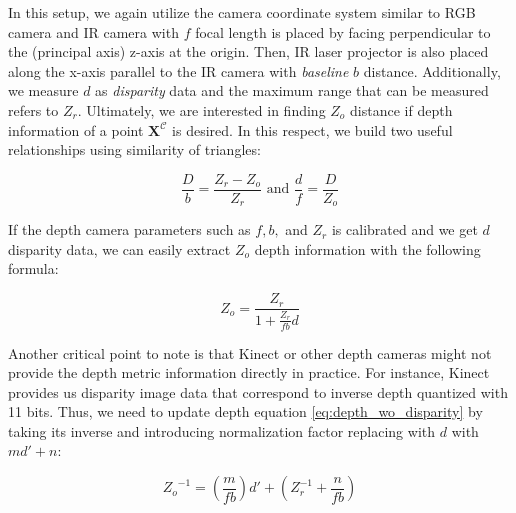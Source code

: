 \documentclass[12pt]{report}
\numberwithin{figure}{section}
\begin{document}
In this setup, we again utilize the camera coordinate system similar to RGB 
camera and IR camera with $f$ focal length is placed by facing perpendicular 
to the (principal axis) z-axis at the origin. Then, IR laser projector is also 
placed along the x-axis parallel to the IR camera with \textit{baseline} 
$b$ distance.  
Additionally, we measure $d$ as \textit{disparity} data and the maximum 
range that can be measured refers to $Z_r$. Ultimately, we are interested in 
finding $Z_o$ distance if depth information of a point 
$\mathbf{X}^{\mathcal{C}}$ is 
desired. In this respect, we build two useful relationships using similarity 
of 
triangles:


\begin{equation}
  \frac{D}{b} = \frac{Z_r - Z_o}{Z_r} \text{ and } \frac{d}{f} = 
  \frac{D}{Z_o}
\end{equation}

If the depth camera parameters such as $f, b,$ and $Z_r$ is calibrated and we 
get $d$ disparity data, we can easily extract $Z_o$ depth 
information with the 
following formula:

\begin{equation}\label{eq:depth_wo_disparity}
  Z_o = \frac{Z_r}{1+\frac{Z_r}{fb}d}
\end{equation}

Another critical point to note is that Kinect or other depth cameras might not 
provide the depth metric information directly in practice. For instance, 
Kinect provides us disparity image data that correspond to inverse depth 
quantized with 11 bits. 
Thus, we need to update depth equation \eqref{eq:depth_wo_disparity} by taking 
its inverse and introducing normalization factor replacing with $d$ with 
$md'+n$:

\begin{equation}\label{eq:depth_w_disparity_reverse}
  {Z_o}^{-1} = (\frac{m}{fb})d' + (Z_r^{-1} + \frac{n}{fb})
\end{equation}
\end{document}
